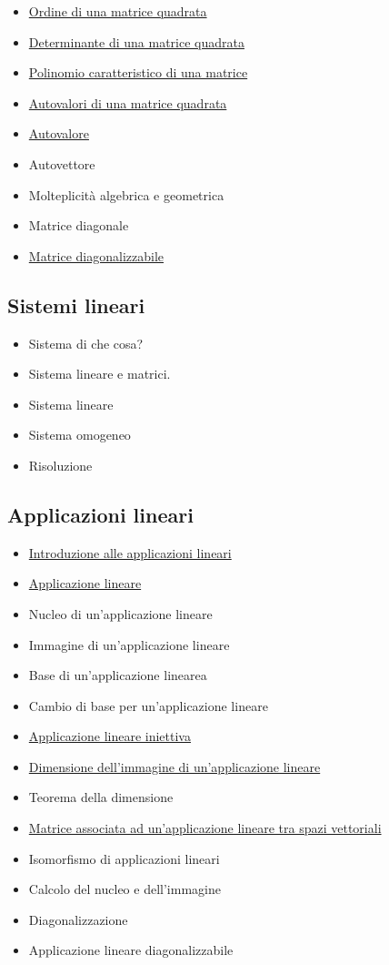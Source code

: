 \documentclass[a4paper,10pt]{article}
\begin{document}
\begin{itemize}
   \item \href{OrdineMatrice.pdf}{Ordine di una matrice quadrata}
   \item \href{DeterminanteMatrice.pdf}{Determinante di una matrice quadrata}
   \item \href{PolinomioMatrice.pdf}{Polinomio caratteristico di una matrice}
   \item \href{AutovaloriMatrice.pdf}{Autovalori di una matrice quadrata}
   \item \href{Autovalore.pdf}{Autovalore}
   \item Autovettore
   \item Molteplicità algebrica e geometrica
   \item Matrice diagonale
   \item \href{MatriceDiagonalizzabile.pdf}{Matrice diagonalizzabile}
\end{itemize}

\subsection{Sistemi lineari}
  \begin{itemize}
   \item Sistema di che cosa?
   \item Sistema lineare e matrici.
   \item Sistema lineare
   \item Sistema omogeneo
   \item Risoluzione
  \end{itemize}
  
\subsection{Applicazioni lineari}
  \begin{itemize}
   \item \href{IntroAppLineari.pdf}{Introduzione alle applicazioni lineari}
   \item \href{ApplicazioneLineare.pdf}{Applicazione lineare}
   \item Nucleo di un'applicazione lineare
   \item Immagine di un'applicazione lineare
   \item Base di un'applicazione linearea
   \item Cambio di base per un'applicazione lineare
   \item \href{ApplicazioneIniettiva.pdf}{Applicazione lineare iniettiva}
   \item \href{DimensioneImmagine.pdf}{Dimensione dell'immagine di un'applicazione lineare}
   \item Teorema della dimensione
   \item \href{MatriceApplicazione.pdf}{Matrice associata ad un'applicazione lineare tra spazi vettoriali}
   \item Isomorfismo di applicazioni lineari
   \item Calcolo del nucleo e dell'immagine
   \item Diagonalizzazione
   \item Applicazione lineare diagonalizzabile
  \end{itemize}
\end{document}
